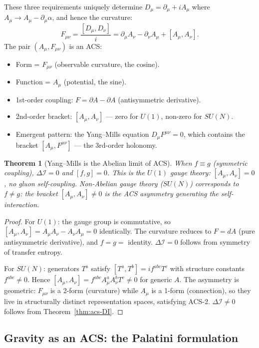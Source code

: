 \documentclass[11pt,a4paper]{article}
\theoremstyle{plain}
\newtheorem{theorem}{Theorem}[section]
\theoremstyle{definition}
\theoremstyle{remark}
\newcommand{\DI}{\Delta\mathcal{I}}
\begin{document}
These three requirements uniquely determine $D_\mu = \partial_\mu + iA_\mu$
where $A_\mu \to A_\mu - \partial_\mu\alpha$, and hence the curvature:
\begin{equation}
  F_{\mu\nu} = \frac{[D_\mu, D_\nu]}{i} = \partial_\mu A_\nu - \partial_\nu A_\mu + [A_\mu, A_\nu].
\end{equation}
The pair $(A_\mu, F_{\mu\nu})$ is an ACS:
\begin{itemize}[noitemsep]
  \item Form = $F_{\mu\nu}$ (observable curvature, the cosine).
  \item Function = $A_\mu$ (potential, the sine).
  \item 1st-order coupling: $F = \partial A - \partial A$ (antisymmetric derivative).
  \item 2nd-order bracket: $[A_\mu, A_\nu]$ --- zero for $U(1)$, non-zero for $SU(N)$.
  \item Emergent pattern: the Yang--Mills equation $D_\mu F^{\mu\nu} = 0$,
    which contains the bracket $[A_\mu, F^{\mu\nu}]$ --- the 3rd-order holonomy.
\end{itemize}

\begin{theorem}[Yang--Mills is the Abelian limit of ACS]\label{thm:YM-abelian}
When $f \equiv g$ (symmetric coupling), $\DI = 0$ and $[f,g] = 0$.  
This is the $U(1)$ gauge theory: $[A_\mu, A_\nu] = 0$, no gluon self-coupling.
Non-Abelian gauge theory ($SU(N)$) corresponds to $f \neq g$: the bracket 
$[A_\mu, A_\nu] \neq 0$ is the ACS asymmetry generating the self-interaction.
\end{theorem}

\begin{proof}
For $U(1)$: the gauge group is commutative, so $[A_\mu, A_\nu] = A_\mu A_\nu - A_\nu A_\mu = 0$ 
identically.  The curvature reduces to $F = dA$ (pure antisymmetric derivative), 
and $f = g = $ identity.  $\DI = 0$ follows from symmetry of transfer entropy.

For $SU(N)$: generators $T^a$ satisfy $[T^a, T^b] = if^{abc}T^c$ with 
structure constants $f^{abc} \neq 0$.  Hence $[A_\mu, A_\nu] = f^{abc}A^a_\mu A^b_\nu T^c \neq 0$ 
for generic $A$.  The asymmetry is geometric: $F_{\mu\nu}$ is a 2-form 
(curvature) while $A_\mu$ is a 1-form (connection), so they live in 
structurally distinct representation spaces, satisfying ACS-2.  
$\DI \neq 0$ follows from Theorem~\ref{thm:acs-DI}.
\end{proof}

\subsection{Gravity as an ACS: the Palatini formulation}
\end{document}
